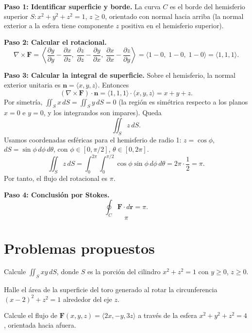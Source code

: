 \begin{myproof}
\textbf{Paso 1: Identificar superficie y borde.}
La curva $C$ es el borde del hemisferio superior $S: x^2+y^2+z^2=1$, $z\ge 0$, orientado con normal hacia arriba (la normal exterior a la esfera tiene componente $z$ positiva en el hemisferio superior).

\textbf{Paso 2: Calcular el rotacional.}
\[
\nabla\times\mathbf{F}
=
\left\langle
\frac{\partial y}{\partial y}-\frac{\partial x}{\partial z},\;
\frac{\partial z}{\partial z}-\frac{\partial y}{\partial x},\;
\frac{\partial x}{\partial x}-\frac{\partial z}{\partial y}
\right\rangle
=
\langle 1-0,\;1-0,\;1-0\rangle
=
\langle 1,1,1\rangle.
\]

\textbf{Paso 3: Calcular la integral de superficie.}
Sobre el hemisferio, la normal exterior unitaria es $\mathbf{n}=\langle x,y,z\rangle$. Entonces
\[
(\nabla\times\mathbf{F})\cdot\mathbf{n} = \langle 1,1,1\rangle\cdot\langle x,y,z\rangle = x+y+z.
\]
Por simetría, $\iint_S x\,dS = \iint_S y\,dS = 0$ (la región es simétrica respecto a los planos $x=0$ e $y=0$, y los integrandos son impares). Queda
\[
\iint_S z\,dS.
\]
Usamos coordenadas esféricas para el hemisferio de radio 1: $z=\cos\phi$, $dS=\sin\phi\,d\phi\,d\theta$, con $\phi\in[0,\pi/2]$, $\theta\in[0,2\pi]$.
\[
\iint_S z\,dS
= \int_0^{2\pi}\int_0^{\pi/2} \cos\phi\sin\phi\,d\phi\,d\theta
= 2\pi \cdot \frac{1}{2} = \pi.
\]
Por tanto, el flujo del rotacional es $\pi$.

\textbf{Paso 4: Conclusión por Stokes.}
\[
\oint_C \mathbf{F}\cdot d\mathbf{r} = \pi.
\]
\[
\boxed{\pi}
\]
\end{myproof}

\section{Problemas propuestos}

\begin{prob}
Calcule $\displaystyle \iint_S xy\,dS$, donde $S$ es la porción del cilindro $x^2+z^2=1$ con $y\ge 0$, $z\ge 0$.
\end{prob}

\begin{prob}
Halle el área de la superficie del toro generado al rotar la circunferencia $(x-2)^2+z^2=1$ alrededor del eje $z$.
\end{prob}

\begin{prob}
Calcule el flujo de $\mathbf{F}(x,y,z)=\langle 2x, -y, 3z\rangle$ a través de la esfera $x^2+y^2+z^2=4$, orientada hacia afuera.
\end{prob}


